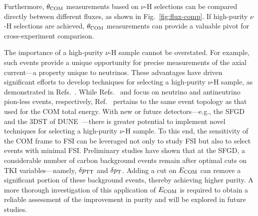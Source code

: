      Furthermore, $\theta_{\textrm{COM}}$ measurements based on $\nu$-H selections can be compared directly between different fluxes, as shown in Fig.~\ref{fig:flux-comp}.
     If high-purity $\nu$-H selections are achieved, $\theta_{\textrm{COM}}$ measurements can provide a valuable pivot for cross-experiment comparison.

     The importance of a high-purity $\nu$-H sample cannot be overstated.
     For example, such events provide a unique opportunity for precise measurements of the axial current—a property unique to neutrinos.
     These advantages have driven significant efforts to develop techniques for selecting a high-purity $\nu$-H sample, as demonstrated in Refs.~\cite{Lu:2015hea,MINERvA:2023avz,Baudis:2023tma}.
     While Refs.~\cite{Baudis:2023tma} and \cite{MINERvA:2023avz} focus on neutrino and antineutrino pion-less events, respectively, Ref.~\cite{Lu:2015hea} pertains to the same event topology as that used for the COM total energy.
     With new or future detectors—e.g., the SFGD and the 3DST of DUNE~\cite{DUNE:2021tad}—there is greater potential to implement novel techniques for selecting a high-purity $\nu$-H sample.
     To this end, the sensitivity of the COM frame to FSI can be leveraged not only to study FSI but also to select events with minimal FSI.
     Preliminary studies have shown that at the SFGD, a considerable number of carbon background events remain after optimal cuts on TKI variables—namely, $\delta p_\textrm{TT}$ and $\delta p_\textrm{T}$.
     Adding a cut on $E_{\textrm{COM}}$ can remove a significant portion of these background events, thereby achieving higher purity.
     A more thorough investigation of this application of $E_{\textrm{COM}}$ is required to obtain a reliable assessment of the improvement in purity and will be explored in future studies.

